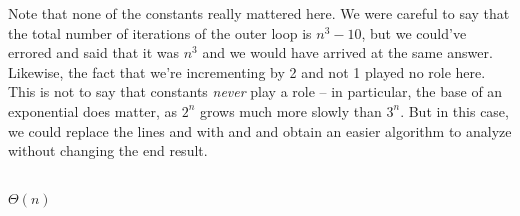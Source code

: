 \begin{prob}
\begin{subprobset}
\begin{subprob}
\begin{soln}
                Note that none of the constants really mattered here. We were careful
                to say that the total number of iterations of the outer loop is $n^3 - 10$,
                but we could've errored and said that it was $n^3$ and we would have
                arrived at the same answer. Likewise, the fact that we're
                incrementing  by 2 and not 1 played no role here. This is not
                to say that constants \emph{never} play a role -- in particular, the base of
                an exponential does matter, as $2^n$ grows much more slowly than $3^n$.
                But in this case, we could replace the lines  and 
                with  and  and obtain an easier algorithm to
                analyze without changing the end result.

            \end{soln}

        \end{subprob}

        \begin{subprob}
            \inputminted{python}{\thisdir/include/part_i.py}

            \begin{soln}
                $\Theta(n)$
            \end{soln}
        \end{subprob}

    \end{subprobset}
\end{prob}
